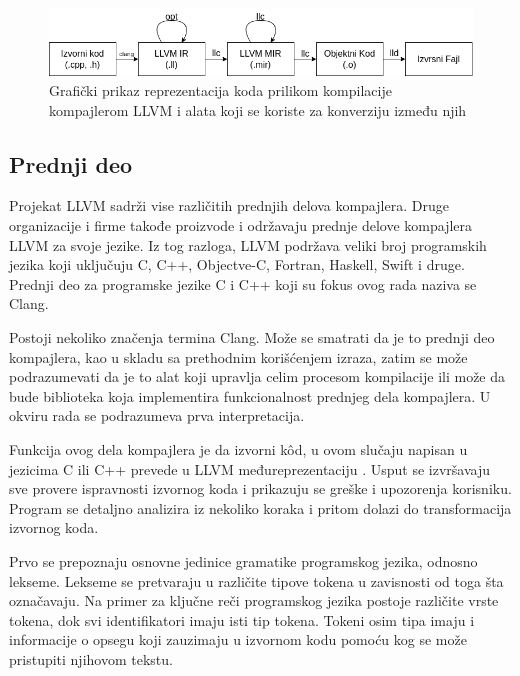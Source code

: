 \documentclass[12pt,oneside]{memoir}
\begin{document}
\begin{figure}[!ht]
  \centering
  \includegraphics[width=\textwidth]{assets/llvm_compile_tools.png}
  \caption{Grafički prikaz reprezentacija koda prilikom kompilacije kompajlerom LLVM i alata koji se koriste za konverziju između njih}
  \label{fig:llvm_compile_tools}
\end{figure}


\subsection{Prednji deo}

Projekat LLVM sadrži vise različitih prednjih delova kompajlera.
Druge organizacije i firme takođe proizvode i održavaju prednje delove kompajlera LLVM za svoje jezike.
Iz tog razloga, LLVM podržava veliki broj programskih jezika koji uključuju C, C++, Objectve-C, Fortran, Haskell, Swift i druge.
Prednji deo za programske jezike C i C++ koji su fokus ovog rada naziva se Clang.

Postoji nekoliko značenja termina Clang.
Može se smatrati da je to prednji deo kompajlera, kao u skladu sa prethodnim korišćenjem izraza, zatim se može podrazumevati da je to alat koji upravlja celim procesom kompilacije ili može da bude biblioteka koja implementira funkcionalnost prednjeg dela kompajlera.
U okviru rada se podrazumeva prva interpretacija.

Funkcija ovog dela kompajlera je da izvorni k\^od, u ovom slučaju napisan u jezicima C ili C++ prevede u LLVM međureprezentaciju \cite{lopes2014llvmcorelibs}.
Usput se izvršavaju sve provere ispravnosti izvornog koda i prikazuju se greške i upozorenja korisniku.
Program se detaljno analizira iz nekoliko koraka i pritom dolazi do transformacija izvornog koda.

Prvo se prepoznaju osnovne jedinice gramatike programskog jezika, odnosno lekseme.
Lekseme se pretvaraju u različite tipove tokena u zavisnosti od toga šta označavaju.
Na primer za ključne reči programskog jezika postoje različite vrste tokena, dok svi identifikatori imaju isti tip tokena.
Tokeni osim tipa imaju i informacije o opsegu koji zauzimaju u izvornom kodu pomoću kog se može pristupiti njihovom tekstu.
\end{document}
